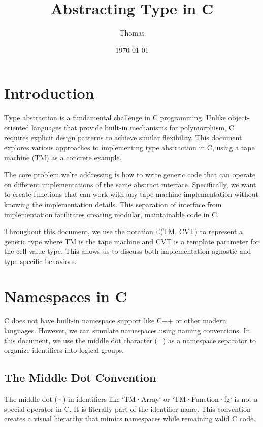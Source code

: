 \documentclass[11pt]{article}
\author{Thomas}
\date{\today}
\title{Abstracting Type in C}
\begin{document}
\maketitle
\tableofcontents


\section{Introduction}
\label{sec:org8b18d97}

Type abstraction is a fundamental challenge in C programming. Unlike object-oriented languages that provide built-in mechanisms for polymorphism, C requires explicit design patterns to achieve similar flexibility. This document explores various approaches to implementing type abstraction in C, using a tape machine (TM) as a concrete example.

The core problem we're addressing is how to write generic code that can operate on different implementations of the same abstract interface. Specifically, we want to create functions that can work with any tape machine implementation without knowing the implementation details. This separation of interface from implementation facilitates creating modular, maintainable code in C.

Throughout this document, we use the notation Ξ(TM, CVT) to represent a generic type where TM is the tape machine and CVT is a template parameter for the cell value type. This allows us to discuss both implementation-agnostic and type-specific behaviors.

\section{Namespaces in C}
\label{sec:org8165afa}

C does not have built-in namespace support like C++ or other modern languages. However, we can simulate namespaces using naming conventions. In this document, we use the middle dot character (·) as a namespace separator to organize identifiers into logical groups.

\subsection{The Middle Dot Convention}
\label{sec:org598d1d1}

The middle dot (·) in identifiers like `TM·Array` or `TM·Function·fg` is not a special operator in C. It is literally part of the identifier name. This convention creates a visual hierarchy that mimics namespaces while remaining valid C code.
\end{document}
